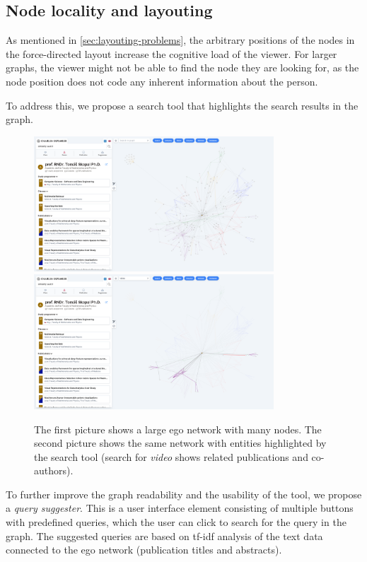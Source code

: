 \subsection{Node locality and layouting}

As mentioned in \ref{sec:layouting-problems}, the arbitrary positions of the nodes in the force-directed layout increase the cognitive load of the viewer.
For larger graphs, the viewer might not be able to find the node they are looking for, as the node position does not code any inherent information about the person.

To address this, we propose a search tool that highlights the search results in the graph.

\begin{figure}[ht!]
    \captionsetup{width=.9\linewidth}
    \includegraphics[width=0.8\textwidth]{../img/big-network.png}
    \includegraphics[width=0.8\textwidth]{../img/big-network-search.png}
    \centering
    \caption{The first picture shows a large ego network with many nodes. The second picture shows the same network with entities highlighted by the search tool (search for \textit{video} shows related publications and co-authors).}
\end{figure}

To further improve the graph readability and the usability of the tool, we propose a \textit{query suggester}. 
This is a user interface element consisting of multiple buttons with predefined queries, which the user can click to search for the query in the graph.
The suggested queries are based on tf-idf analysis of the text data connected to the ego network (publication titles and abstracts). 

